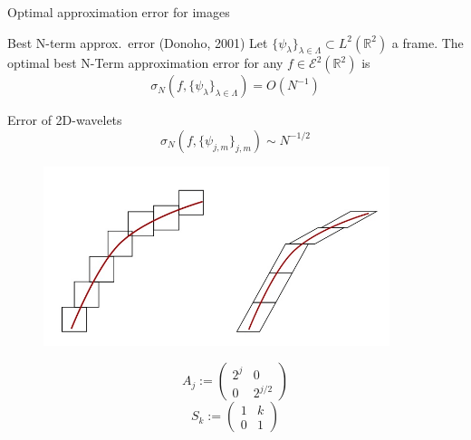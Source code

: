 \begin{frame}{Optimal approximation error for images}
\begin{block}{Best N-term approx.\ error (Donoho, 2001)}
Let $\{\psi_{\lambda}\}_{\lambda\in\Lambda}\subset L^2(\mathbb{R}^2)$ a frame. The optimal best N-Term approximation error for any $f\in\mathcal{E}^2(\mathbb{R}^2)$ is
$$
\sigma_N(f,\{\psi_{\lambda}\}_{\lambda\in\Lambda})=O(N^{-1})
$$
\end{block}
\pause
\begin{block}{Error of 2D-wavelets}
$$
\sigma_N(f,\{\psi_{j,m}\}_{j,m})\sim N^{-1/2}
$$
\end{block}
\pause
\begin{minipage}{0.5\textwidth}
\begin{figure}[h!]
\centering
\includegraphics[width=0.9\textwidth]{./Images/anisotropic_isotropic.jpg}
\end{figure}
\end{minipage}\hfill
\begin{minipage}{0.49 \textwidth}
$$
A_j:=
\left(
\begin{matrix}
2^j & 0 \\
0 & 2^{j/2}
\end{matrix}
\right)
$$
\bigskip
$$
S_k:=
\left(
\begin{matrix}
1 & k \\
0 & 1
\end{matrix}
\right)
$$
\end{minipage}
\end{frame}


